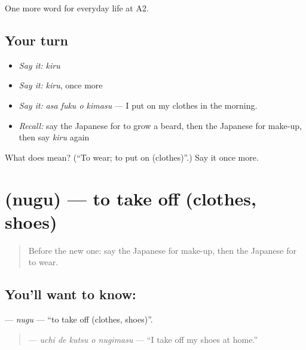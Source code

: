 \begin{grammarlens}[title={What you've built}]
One more word for everyday life at A2.
\end{grammarlens}

\subsection*{Your turn}
\begin{itemize}
\raggedright
  \item \emph{Say it:} \emph{kiru}
  \item \emph{Say it:} \emph{kiru}, once more
  \item \emph{Say it:} \emph{asa fuku o kimasu} — I put on my clothes in the morning.
  \item \emph{Recall:} say the Japanese for to grow a beard, then the Japanese for make-up, then say \emph{kiru} again
\end{itemize}

\begin{tcolorbox}[breakable,colback=teal!4,colframe=teal!35!black,title={Before you move on}]
What does  mean? (\textquotedblleft{}To wear; to put on (clothes)\textquotedblright{}.) Say it once more.
\end{tcolorbox}
\section[\texorpdfstring{\ja{ぬぐ} (nugu)}{ぬぐ (nugu)}]{ (nugu) — to take off (clothes, shoes)}

\label{lesson:JA-C149-nugu}



\begin{quote}
Before the new one: say the Japanese for make-up, then the Japanese for to wear.
\end{quote}

\subsection*{You'll want to know: }
\textbf{} — \emph{nugu} — \textquotedblleft{}to take off (clothes, shoes)\textquotedblright{}.

\begin{quote}
\textbf{  } — \emph{uchi de kutsu o nugimasu} — \textquotedblleft{}I take off my shoes at home.\textquotedblright{}
\end{quote}

